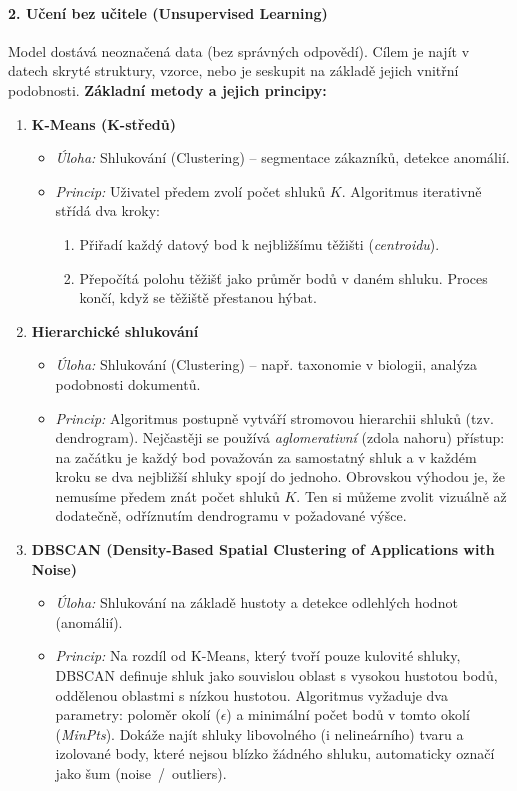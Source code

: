 \paragraph*{2. Učení bez učitele (Unsupervised Learning)}
Model dostává neoznačená data (bez správných odpovědí). Cílem je najít v datech skryté struktury, vzorce, nebo je seskupit na základě jejich vnitřní podobnosti.
\newpage
\textbf{Základní metody a jejich principy:}
\begin{enumerate}
    \item \textbf{K-Means (K-středů)}
    \begin{itemize}
        \item \textit{Úloha:} Shlukování (Clustering) -- segmentace zákazníků, detekce anomálií.
        \item \textit{Princip:} Uživatel předem zvolí počet shluků $K$. Algoritmus iterativně střídá dva kroky: 
        \begin{enumerate}
            \item[1)] Přiřadí každý datový bod k nejbližšímu těžišti (\textit{centroidu}). 
            \item[2)] Přepočítá polohu těžišť jako průměr bodů v daném shluku. Proces končí, když se těžiště přestanou hýbat.
        \end{enumerate}
    \end{itemize}

    \item \textbf{Hierarchické shlukování}
    \begin{itemize}
        \item \textit{Úloha:} Shlukování (Clustering) -- např. taxonomie v biologii, analýza podobnosti dokumentů.
        \item \textit{Princip:} Algoritmus postupně vytváří stromovou hierarchii shluků (tzv. dendrogram). Nejčastěji se používá \textit{aglomerativní} (zdola nahoru) přístup: na začátku je každý bod považován za samostatný shluk a v každém kroku se dva nejbližší shluky spojí do jednoho. Obrovskou výhodou je, že nemusíme předem znát počet shluků $K$. Ten si můžeme zvolit vizuálně až dodatečně, odříznutím dendrogramu v požadované výšce.
    \end{itemize}
    
    \item \textbf{DBSCAN (Density-Based Spatial Clustering of Applications with Noise)}
    \begin{itemize}
        \item \textit{Úloha:} Shlukování na základě hustoty a detekce odlehlých hodnot (anomálií).
        \item \textit{Princip:} Na rozdíl od K-Means, který tvoří pouze kulovité shluky, DBSCAN definuje shluk jako souvislou oblast s vysokou hustotou bodů, oddělenou oblastmi s nízkou hustotou. Algoritmus vyžaduje dva parametry: poloměr okolí ($\epsilon$) a minimální počet bodů v tomto okolí (\textit{MinPts}). Dokáže najít shluky libovolného (i nelineárního) tvaru a izolované body, které nejsou blízko žádného shluku, automaticky označí jako šum (noise~/~outliers).
    \end{itemize}
    
\end{enumerate}
